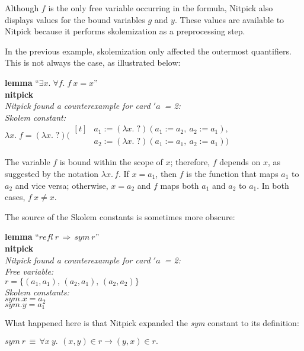 \documentclass[a4paper,12pt]{article}
\def\unk{{?}}
\def\undef{(\lambda x.\; \unk)}
\begin{document}
Although $f$ is the only free variable occurring in the formula, Nitpick also
displays values for the bound variables $g$ and $y$. These values are available
to Nitpick because it performs skolemization as a preprocessing step.

In the previous example, skolemization only affected the outermost quantifiers.
This is not always the case, as illustrated below:

\prew
\textbf{lemma} ``$\exists x.\; \forall f.\; f~x = x$'' \\
\textbf{nitpick} \\[2\smallskipamount]
\slshape
Nitpick found a counterexample for \textit{card} $'a$~= 2: \\[2\smallskipamount]
\hbox{}\qquad Skolem constant: \nopagebreak \\
\hbox{}\qquad\qquad $\lambda x.\; f =
    \undef{}(\!\begin{aligned}[t]
    & a_1 := \undef{}(a_1 := a_2,\> a_2 := a_1), \\[-2pt]
    & a_2 := \undef{}(a_1 := a_1,\> a_2 := a_1))\end{aligned}$
\postw

The variable $f$ is bound within the scope of $x$; therefore, $f$ depends on
$x$, as suggested by the notation $\lambda x.\,f$. If $x = a_1$, then $f$ is the
function that maps $a_1$ to $a_2$ and vice versa; otherwise, $x = a_2$ and $f$
maps both $a_1$ and $a_2$ to $a_1$. In both cases, $f~x \not= x$.

The source of the Skolem constants is sometimes more obscure:

\prew
\textbf{lemma} ``$\mathit{refl}~r\,\Longrightarrow\, \mathit{sym}~r$'' \\
\textbf{nitpick} \\[2\smallskipamount]
\slshape
Nitpick found a counterexample for \textit{card} $'a$~= 2: \\[2\smallskipamount]
\hbox{}\qquad Free variable: \nopagebreak \\
\hbox{}\qquad\qquad $r = \{(a_1, a_1),\, (a_2, a_1),\, (a_2, a_2)\}$ \\
\hbox{}\qquad Skolem constants: \nopagebreak \\
\hbox{}\qquad\qquad $\mathit{sym}.x = a_2$ \\
\hbox{}\qquad\qquad $\mathit{sym}.y = a_1$
\postw

What happened here is that Nitpick expanded the \textit{sym} constant to its
definition:

\prew
$\mathit{sym}~r \,\equiv\,
 \forall x\> y.\,\> (x, y) \in r \longrightarrow (y, x) \in r.$
\postw
\end{document}
